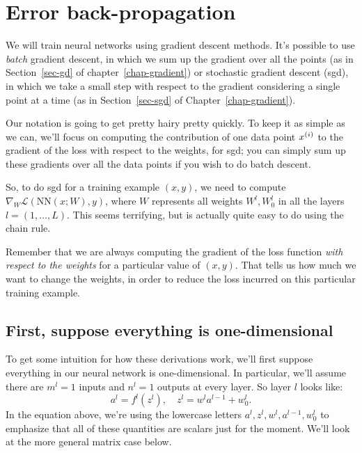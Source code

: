 
\section{Error back-propagation}
We will train neural networks using gradient descent methods.  It's
possible to use {\em batch} gradient descent, in which we sum up the
gradient over all the points (as in Section~\ref{sec-gd} of
chapter~\ref{chap-gradient}) or
stochastic gradient descent ({\sc sgd}), in which we take a small step with
respect to the gradient considering a single point at a time (as in
Section~\ref{sec-sgd} of Chapter~\ref{chap-gradient}).

Our notation is going to get pretty hairy pretty quickly.  To keep it
as simple as we can, we'll focus on computing the contribution of one
data point $x^{(i)}$ to the gradient of the loss with respect to the
weights, for {\sc sgd}; you can simply sum up these gradients over all
the data points if you wish to do batch descent.

So, to do {\sc sgd} for a training example $(x, y)$, we need to
compute $\nabla_W \mathcal{L}(\text{NN}(x;W),y)$,
where $W$ represents all weights $W^l, W_0^l$ in all the layers $l =
  (1, \ldots, L)$. This seems terrifying,
but is actually quite easy to do using the chain rule.

Remember that we are always computing the gradient of the loss
function {\em with respect to the weights} for a particular value of
$(x,  y)$.  That tells us how much we want to change the weights, in
order to reduce the loss incurred on this particular training example.

\subsection{First, suppose everything is one-dimensional}

To get some intuition for how these derivations work, we'll first suppose everything in our neural network is one-dimensional.
In particular, we'll assume there are $m^l = 1$ inputs and $n^l = 1$ outputs at every layer. So layer $l$ looks like:
\[
  a^l = f^l(z^l), \quad z^l = w^l a^{l-1} + w^l_0.
\]
In the equation above, we're using the lowercase letters $a^l, z^l, w^l, a^{l-1}, w^l_0$ to emphasize that all of these quantities are scalars just for the moment. We'll look at the more general matrix case below.


